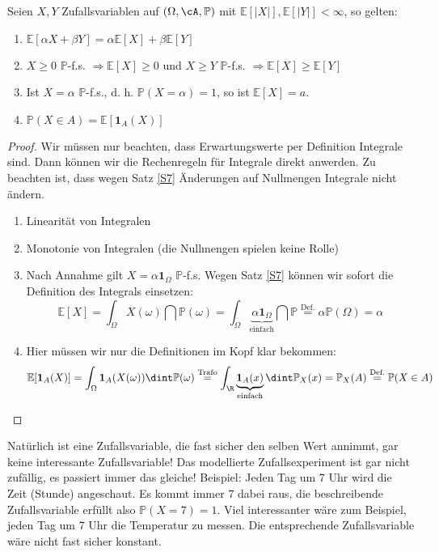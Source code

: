 \begin{prop}\label{rechenregeln}
	Seien $X,Y$ Zufallsvariablen auf $(\Omega, \cA, \mathbb{P})$ mit $\mathbb{E}[|X|],\mathbb{E}[|Y|] < \infty$, so gelten:
	\begin{enumerate}[label=(\roman*)]
		\item $\mathbb{E}[\alpha X + \beta Y] = \alpha \mathbb{E}[X] + \beta \mathbb{E}[Y]$
		\item $X \geq 0$ $\mathbb P$-f.s. $\Rightarrow \mathbb{E}[X] \geq 0$ und  $X \geq Y$ $\mathbb P$-f.s. $\Rightarrow \mathbb{E}[X] \geq \mathbb{E}[Y]$
		\item Ist $X = \alpha$  $\mathbb{P}$-f.s., d. h. $\mathbb P(X=\alpha)=1$, so ist $\mathbb{E}[X] = a$.
		\item $\mathbb{P}(X \in A) = \mathbb{E}[\mathbf{1}_A(X)]$
	\end{enumerate}
\end{prop}
\begin{proof}
	Wir m\"ussen nur beachten, dass Erwartungswerte per Definition Integrale sind. Dann k\"onnen wir die Rechenregeln f\"ur Integrale direkt anwerden. Zu beachten ist, dass wegen Satz \ref{S7} \"Anderungen auf Nullmengen Integrale nicht \"andern.
	\begin{enumerate}[label=(\roman*)]
	\item Linearität von Integralen
	\item Monotonie von Integralen (die Nullmengen spielen keine Rolle)
	\item Nach Annahme gilt $X = \alpha \mathbf{1}_{\Omega}$ $\mathbb{P}$-f.s. Wegen Satz \ref{S7} k\"onnen wir sofort die Definition des Integrals einsetzen:
	\[ \mathbb{E}[X] = \int_{\Omega} X(\omega) \dint \mathbb{P}(\omega) = \int_{\Omega} \underbrace{\alpha \mathbf{1}_{\Omega}}_{\text{einfach}} \dint \mathbb{P} \overset{\text{Def.}}{=} \alpha \mathbb{P}(\Omega) = \alpha  \]
	\item Hier m\"ussen wir nur die Definitionen im Kopf klar bekommen:
	\begin{gather*}
		\mathbb{E}[\mathbf{1}_A(X)] = \int_{\Omega} \mathbf{1}_A(X(\omega)) \dint \mathbb{P}(\omega) \overset{\text{Trafo}}{=} \int_{\R} \underbrace{\mathbf{1}_A(x)}_{\text{einfach}} \dint \mathbb{P}_X(x) = \mathbb{P}_X(A) \overset{\text{Def.}}{=} \mathbb{P}(X \in A)
	\end{gather*}
\end{enumerate}
\end{proof}
Nat\"urlich ist eine Zufallsvariable, die fast sicher den selben Wert annimmt, gar keine interessante Zufallsvariable! Das modellierte Zufallsexperiment ist gar nicht zuf\"allig, es passiert immer das gleiche! Beispiel: Jeden Tag um 7 Uhr wird die Zeit (Stunde) angeschaut. Es kommt immer $7$ dabei raus, die beschreibende Zufallsvariable erf\"ullt also $\mathbb P(X=7)=1$. Viel interessanter w\"are zum Beispiel, jeden Tag um 7 Uhr die Temperatur zu messen. Die entsprechende Zufallsvariable w\"are nicht fast sicher konstant.
